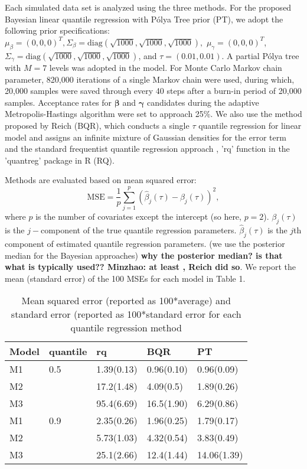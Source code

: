 \documentclass[12pt]{article}
\newcommand{\polya}{P\'{o}lya}
\begin{document}
Each simulated data set is analyzed using the three methods. For the proposed
Bayesian linear quantile regression with \polya{} Tree prior (PT),
we adopt the following prior specifications: $\mu_{\beta} = (0,0,0)^T, 
\Sigma_{\beta}=\text{diag} (\sqrt{1000},\sqrt{1000},\sqrt{1000}), $
$\mu_{\gamma} = (0,0,0)^T$, 
$\Sigma_{\gamma}=\text{diag} (\sqrt{1000},\sqrt{1000},\sqrt{1000}) $,
and $\tau=(0.01, 0.01)$. A partial \polya{} tree with $M=7$ levels was adopted
in the model. For Monte Carlo Markov chain parameter, 820,000
iterations of a single Markov chain were used, during which, 20,000
samples were saved through every 40 steps after a burn-in period of
20,000 samples. Acceptance rates for $\bm{\beta}$ and $\bm{\gamma}$ candidates
during the adaptive Metropolis-Hastings algorithm were set to approach
25\%.  
We also use the method proposed by Reich (BQR),
which conducts a single $\tau$
quantile regression for linear model and assigns an infinite mixture
of Gaussian densities for the error term and the
standard frequentist quantile regression approach , 'rq' function in
the 'quantreg' package in R (RQ). 

Methods are evaluated  based on mean squared error: 
\begin{displaymath}
  \text{MSE}  = \frac{1}{p} \sum_{j=1}^p (\hat{\beta}_j(\tau) -
  \beta_j(\tau))^2, 
\end{displaymath}
where $p$ is the number of covariates except the intercept (so here,
$p=2$). $\beta_j(\tau)$ is the 
$j-$component of the true quantile regression
parameters. $\hat{\beta}_j(\tau)$ is the  $j$th component of estimated
quantile regression parameters. (we use the posterior median for
the Bayesian approaches) {\bf why the posterior median?  is that what
  is typically used?? Minzhao: at least , Reich did so}. We report the
mean (standard error) of the 100 
MSEs for each model in Table 1. 

\begin{center}
  \begin{table}[h]
    \centering
    \caption[]{ Mean squared error (reported as 100*average) and standard
      error (reported as 100*standard error for each
      quantile regression method}
    \vspace{4mm}
    \begin{tabular}[tb]{l|l|lll}
      \hline
      Model & quantile & rq         & BQR        & PT          \\
      \hline
      M1    & 0.5      & 1.39(0.13) & 0.96(0.10) & 0.96(0.09)  \\
      M2    &          & 17.2(1.48) & 4.09(0.5)  & 1.89(0.26)  \\
      M3    &          & 95.4(6.69) & 16.5(1.90) & 6.29(0.86)  \\
      \hline
      M1    & 0.9      & 2.35(0.26) & 1.96(0.25) & 1.79(0.17)  \\
      M2    &          & 5.73(1.03) & 4.32(0.54) & 3.83(0.49)  \\
      M3    &          & 25.1(2.66) & 12.4(1.44) & 14.06(1.39) \\
      \hline
    \end{tabular}
    \label{tab:1}
  \end{table}
\end{center}
\end{document}
